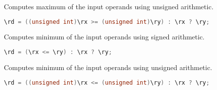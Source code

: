 Computes maximum of the input operands using unsigned arithmetic.

\begin{lstlisting}[numbers=none, basicstyle=\ttfamily\footnotesize, language=C++]
\rd = ((unsigned int)\rx >= (unsigned int)\ry) : \rx ? \ry;
\end{lstlisting}

Computes minimum of the input operands using signed arithmetic.

\begin{lstlisting}[numbers=none, basicstyle=\ttfamily\footnotesize, language=C++]
\rd = (\rx <= \ry) : \rx ? \ry;
\end{lstlisting}

Computes minimum of the input operands using unsigned arithmetic.

\begin{lstlisting}[numbers=none, basicstyle=\ttfamily\footnotesize, language=C++]
\rd = ((unsigned int)\rx <= (unsigned int)\ry) : \rx ? \ry;
\end{lstlisting}
